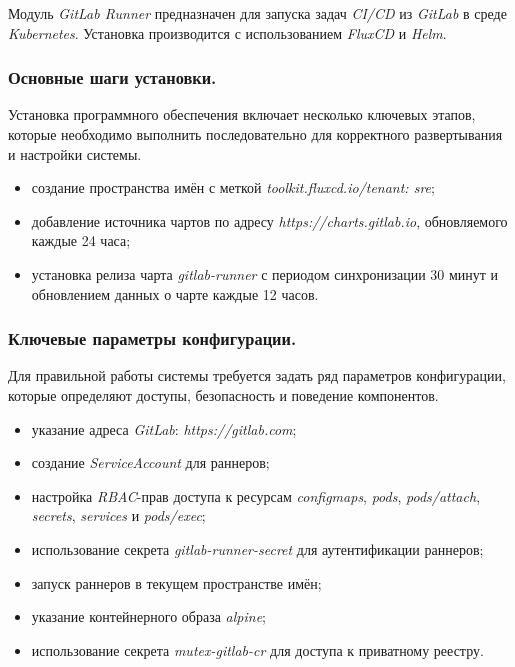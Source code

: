 Модуль \textit{GitLab Runner} предназначен для запуска задач \textit{CI/CD} из \textit{GitLab} в среде \textit{Kubernetes}. Установка производится с использованием \textit{FluxCD} и \textit{Helm}.

\subsubsection{Основные шаги установки.} Установка программного обеспечения включает несколько ключевых этапов, которые необходимо выполнить последовательно для корректного развертывания и настройки системы.

\begin{itemize}
    \item создание пространства имён с меткой \textit{toolkit.fluxcd.io/tenant: sre};
    \item добавление источника чартов по адресу \textit{https://charts.gitlab.io}, обновляемого каждые 24 часа;
    \item установка релиза чарта \textit{gitlab-runner} с периодом синхронизации 30 минут и обновлением данных о чарте каждые 12 часов.
\end{itemize}

\subsubsection{Ключевые параметры конфигурации.} Для правильной работы системы требуется задать ряд параметров конфигурации, которые определяют доступы, безопасность и поведение компонентов.

\begin{itemize}
    \item указание адреса \textit{GitLab}: \textit{https://gitlab.com};
    \item создание \textit{ServiceAccount} для раннеров;
    \item настройка \textit{RBAC}-прав доступа к ресурсам \textit{configmaps}, \textit{pods}, \textit{pods/attach}, \textit{secrets}, \textit{services} и \textit{pods/exec};
    \item использование секрета \textit{gitlab-runner-secret} для аутентификации раннеров;
    \item запуск раннеров в текущем пространстве имён;
    \item указание контейнерного образа \textit{alpine};
    \item использование секрета \textit{mutex-gitlab-cr} для доступа к приватному реестру.
\end{itemize}





